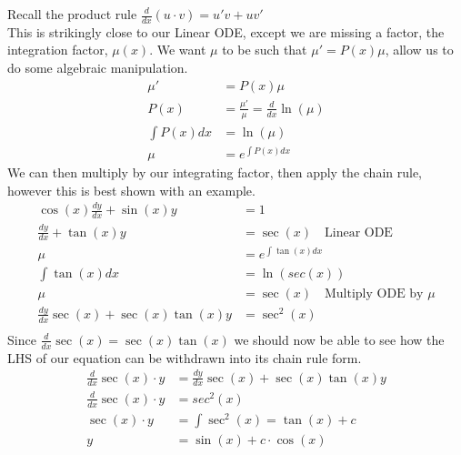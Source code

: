 \documentclass{article}
\begin{document}
Recall the product rule $\frac{d}{dx}(u\cdot v) = u'v + uv'$\\
This is strikingly close to our Linear ODE, except we are missing a factor, the integration factor, $\mu(x)$.
We want $\mu$ to be such that $\mu' = P(x)\mu$, allow us to do some algebraic manipulation.
\begin{align*}
    \mu' &= P(x)\mu\\
    P(x) &= \frac{\mu'}{\mu} = \frac{d}{dx}\ln(\mu)\\
    \int P(x) dx &= \ln(\mu)\\
    \mu &= e^{\int P(x) dx}
\end{align*}
We can then multiply by our integrating factor, then apply the chain rule, however this is best shown with an example.
\begin{align*}
    \cos(x)\frac{dy}{dx} + \sin(x)y &= 1\\
    \frac{dy}{dx} + \tan(x)y &= \sec(x) \quad\textrm{Linear ODE}\\
    \mu &= e^{\int \tan(x) dx}\\
    \int \tan(x) dx &= \ln(sec(x))\\
    \mu &= \sec(x) \quad\textrm{Multiply ODE by $\mu$}\\
    \frac{dy}{dx}\sec(x) + \sec(x)\tan(x)y &= \sec^2(x)\\
\end{align*}
\newpage
Since $\frac{d}{dx}\sec(x) = \sec(x)\tan(x)$ we should now be able to see how the LHS of our equation can be withdrawn 
into its chain rule form.
\begin{align*}
    \frac{d}{dx}\sec(x)\cdot y &= \frac{dy}{dx}\sec(x) + \sec(x)\tan(x)y\\
    \frac{d}{dx}\sec(x)\cdot y &= sec^2(x)\\
    \sec(x) \cdot y &= \int \sec^2(x) = \tan(x) + c\\
    y &= \sin(x) + c\cdot \cos(x)
\end{align*}
\end{document}
